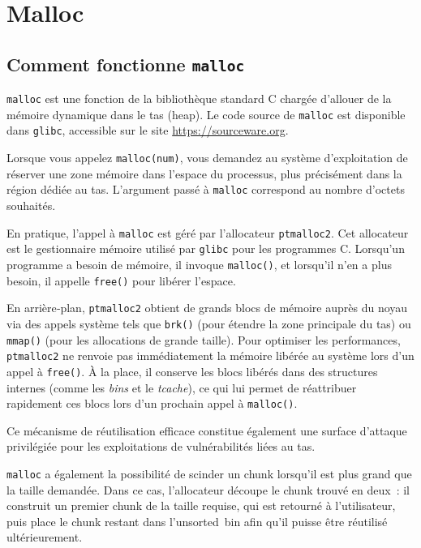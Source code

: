 \section{Malloc}

\subsection{Comment fonctionne \texttt{malloc}}

\texttt{malloc} est une fonction de la bibliothèque standard C chargée d'allouer de la mémoire dynamique dans le tas (heap).
Le code source de \texttt{malloc} est disponible dans \texttt{glibc}, accessible sur le site \url{https://sourceware.org}.

\vp

Lorsque vous appelez \texttt{malloc(num)}, vous demandez au système d'exploitation
de réserver une zone mémoire dans l'espace du processus, plus précisément dans la
région dédiée au tas.
L'argument passé à \texttt{malloc} correspond au nombre d'octets souhaités.

En pratique, l'appel à \texttt{malloc} est géré par l'allocateur \texttt{ptmalloc2}.
Cet allocateur est le gestionnaire mémoire utilisé par \texttt{glibc} pour les
programmes C. Lorsqu'un programme a besoin de mémoire, il invoque
\texttt{malloc()}, et lorsqu'il n'en a plus besoin, il appelle \texttt{free()}
pour libérer l'espace.

En arrière‑plan, \texttt{ptmalloc2} obtient de grands blocs de mémoire auprès
du noyau via des appels système tels que \texttt{brk()} (pour étendre la zone
principale du tas) ou \texttt{mmap()} (pour les allocations de grande taille).
Pour optimiser les performances, \texttt{ptmalloc2} ne renvoie pas immédiatement
la mémoire libérée au système lors d'un appel à \texttt{free()}.
À la place, il conserve les blocs libérés dans des structures internes
(comme les \emph{bins} et le \emph{tcache}), ce qui lui permet de réattribuer
rapidement ces blocs lors d'un prochain appel à \texttt{malloc()}.

Ce mécanisme de réutilisation efficace constitue également une surface d'attaque
privilégiée pour les exploitations de vulnérabilités liées au tas.

\texttt{malloc} a également la possibilité de scinder un chunk lorsqu’il est plus grand
que la taille demandée. Dans ce cas, l’allocateur découpe le chunk trouvé en deux~:
il construit un premier chunk de la taille requise, qui est retourné à l’utilisateur,
puis place le chunk restant dans l’unsorted~bin afin qu’il puisse être réutilisé
ultérieurement.


